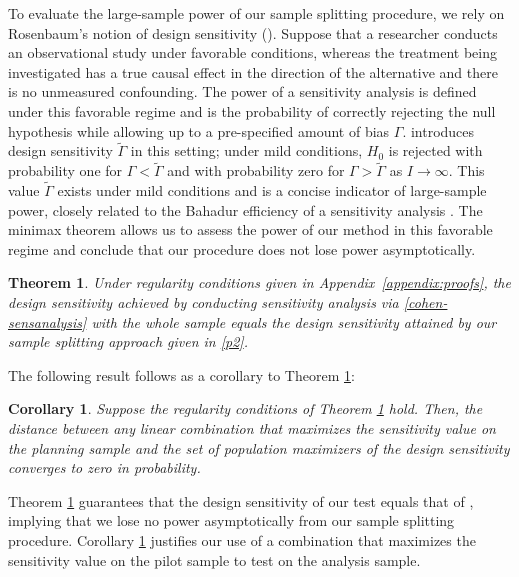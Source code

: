 \documentclass[12pt,leqno,titlepage]{amsart}
\newcommand{\1}{\mathbbm{1}}
\newtheorem{theorem}{Theorem}[]
\newtheorem{corollary}{Corollary}[]
\begin{document}
\begin{bibunit}
To evaluate the large-sample power of our sample splitting procedure, we rely on Rosenbaum's notion of design sensitivity (\citeyear{rosenbaum2004design}). Suppose that a researcher conducts an observational study under favorable conditions, whereas the treatment being investigated has a true causal effect in the direction of the alternative and there is no unmeasured confounding.
The power of a sensitivity analysis is defined under this favorable regime and is the probability of correctly rejecting the null hypothesis while allowing up to a pre-specified amount of bias $\Gamma$. \cite{rosenbaum2004design} introduces design sensitivity $\tilde{\Gamma}$ in this setting; under mild conditions, $H_0$ is rejected with probability one for $\Gamma < \tilde{\Gamma}$ and with probability zero for $\Gamma > \tilde{\Gamma}$ as $I \rightarrow \infty$. This value $\tilde{\Gamma}$ exists under mild conditions and is a concise indicator of large-sample power, closely related to the Bahadur efficiency of a sensitivity analysis \citep{rosenbaum2015bahadur}.
The minimax theorem allows us to assess the power of our method in this favorable regime and conclude that our procedure does not lose power asymptotically.

\begin{theorem} \label{convergence-thm}
    Under regularity conditions given in Appendix~\ref{appendix:proofs}, the design sensitivity achieved by conducting sensitivity analysis via  \eqref{cohen-sensanalysis} %
    with the whole sample equals the design sensitivity attained by our sample splitting approach given in \eqref{p2}.
\end{theorem}

The following result follows as a corollary to Theorem \ref{convergence-thm}:

\begin{corollary} \label{corr2}
    Suppose the regularity conditions of Theorem \ref{convergence-thm} hold. Then, the distance between any linear combination that maximizes the sensitivity value on the planning sample and the set of population maximizers of the design sensitivity converges to zero in probability.
\end{corollary}

Theorem \ref{convergence-thm} guarantees that the design sensitivity of our test equals that of \cite{cohen2020multivariate}, implying that we lose no power asymptotically from our sample splitting procedure.
Corollary \ref{corr2} justifies our use of a combination that maximizes the sensitivity value on the pilot sample to test on the analysis sample.




\end{bibunit}
\end{document}
